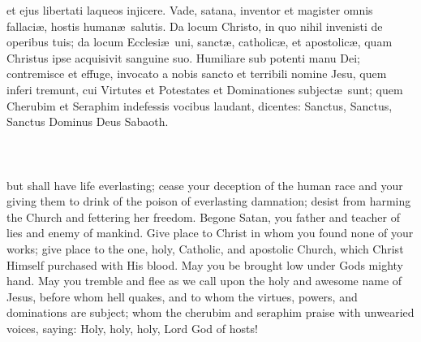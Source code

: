 \begin{multicols}{2}
\noindent
et ejus libertati laqueos injicere. Vade, satana, inventor et magister omnis fallaci\ae , hostis human\ae \ salutis. Da locum Christo, in quo nihil invenisti de operibus tuis; da locum Ecclesi\ae \ uni, sanct\ae , catholic\ae , et apostolic\ae , quam Christus ipse acquisivit sanguine suo. Humiliare sub potenti manu Dei; contremisce et effuge, invocato a nobis sancto et terribili nomine Jesu, quem inferi tremunt, cui Virtutes et Potestates et Dominationes subject\ae \ sunt; quem Cherubim et Seraphim indefessis vocibus laudant, dicentes: Sanctus, Sanctus, Sanctus Dominus Deus Sabaoth.\\ \\
 \\ \\
but shall have life everlasting; cease your deception of the human race and your giving them to drink of the poison of everlasting damnation; desist from harming the Church and fettering her freedom. Begone Satan, you father and teacher of lies and enemy of mankind. Give place to Christ in whom you found none of your works; give place to the one, holy, Catholic, and apostolic Church, which Christ Himself purchased with His blood. May you be brought low under Gods mighty hand.  May you tremble and flee as we call upon the holy and awesome name of Jesus, before whom hell quakes, and to whom the virtues, powers,  and dominations are subject; whom the cherubim and seraphim praise with unwearied voices, saying: Holy, holy, holy, Lord God of hosts!
\end{multicols}


